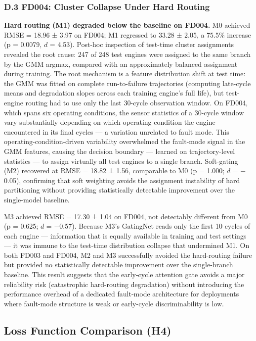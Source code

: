 \documentclass[preprint,10pt]{elsarticle}
\begin{document}
\subsubsection{D.3 FD004: Cluster Collapse Under Hard Routing}

\textbf{Hard routing (M1) degraded below the baseline on FD004.} M0 achieved RMSE = 18.96 ± 3.97 on FD004; M1 regressed to 33.28 ± 2.05, a 75.5\% increase (p = 0.0079, $d$ = 4.53). Post-hoc inspection of test-time cluster assignments revealed the root cause: 247 of 248 test engines were assigned to the same branch by the GMM argmax, compared with an approximately balanced assignment during training. The root mechanism is a feature distribution shift at test time: the GMM was fitted on complete run-to-failure trajectories (computing late-cycle means and degradation slopes across each training engine's full life), but test-engine routing had to use only the last 30-cycle observation window. On FD004, which spans six operating conditions, the sensor statistics of a 30-cycle window vary substantially depending on which operating condition the engine encountered in its final cycles --- a variation unrelated to fault mode. This operating-condition-driven variability overwhelmed the fault-mode signal in the GMM features, causing the decision boundary --- learned on trajectory-level statistics --- to assign virtually all test engines to a single branch. Soft-gating (M2) recovered at RMSE = 18.82 ± 1.56, comparable to M0 (p = 1.000; $d$ = $-$0.05), confirming that soft weighting avoids the assignment instability of hard partitioning without providing statistically detectable improvement over the single-model baseline.

M3 achieved RMSE = 17.30 ± 1.04 on FD004, not detectably different from M0 (p = 0.625; $d$ = $-$0.57). Because M3's GatingNet reads only the first 10 cycles of each engine — information that is equally available in training and test settings — it was immune to the test-time distribution collapse that undermined M1. On both FD003 and FD004, M2 and M3 successfully avoided the hard-routing failure but provided no statistically detectable improvement over the single-branch baseline. This result suggests that the early-cycle attention gate avoids a major reliability risk (catastrophic hard-routing degradation) without introducing the performance overhead of a dedicated fault-mode architecture for deployments where fault-mode structure is weak or early-cycle discriminability is low.

\subsection{Loss Function Comparison (H4)}
\end{document}
